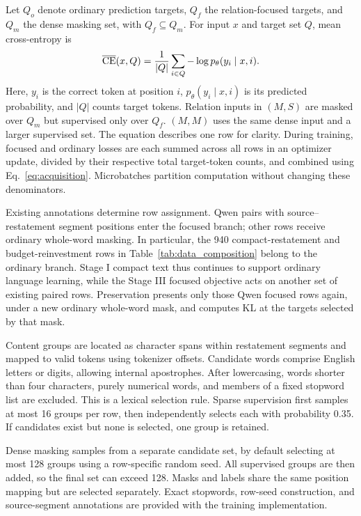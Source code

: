 Let $Q_o$ denote ordinary prediction targets, $Q_f$ the relation-focused targets, and $Q_m$ the dense masking set, with $Q_f\subseteq Q_m$. For input $x$ and target set $Q$, mean cross-entropy is
\begin{equation}
 \overline{\operatorname{CE}}(x,Q)=\frac{1}{|Q|}\sum_{i\in Q}-\log p_\theta(y_i\mid x,i).
\end{equation}
Here, $y_i$ is the correct token at position $i$, $p_\theta(y_i\mid x,i)$ is its predicted probability, and $|Q|$ counts target tokens. Relation inputs in $(M,S)$ are masked over $Q_m$ but supervised only over $Q_f$. $(M,M)$ uses the same dense input and a larger supervised set. The equation describes one row for clarity. During training, focused and ordinary losses are each summed across all rows in an optimizer update, divided by their respective total target-token counts, and combined using Eq.~\eqref{eq:acquisition}. Microbatches partition computation without changing these denominators.

Existing annotations determine row assignment. Qwen pairs with source--restatement segment positions enter the focused branch; other rows receive ordinary whole-word masking. In particular, the 940 compact-restatement and budget-reinvestment rows in Table~\ref{tab:data_composition} belong to the ordinary branch. Stage I compact text thus continues to support ordinary language learning, while the Stage III focused objective acts on another set of existing paired rows. Preservation presents only those Qwen focused rows again, under a new ordinary whole-word mask, and computes KL at the targets selected by that mask.

Content groups are located as character spans within restatement segments and mapped to valid tokens using tokenizer offsets. Candidate words comprise English letters or digits, allowing internal apostrophes. After lowercasing, words shorter than four characters, purely numerical words, and members of a fixed stopword list are excluded. This is a lexical selection rule. Sparse supervision first samples at most 16 groups per row, then independently selects each with probability 0.35. If candidates exist but none is selected, one group is retained.

Dense masking samples from a separate candidate set, by default selecting at most 128 groups using a row-specific random seed. All supervised groups are then added, so the final set can exceed 128. Masks and labels share the same position mapping but are selected separately. Exact stopwords, row-seed construction, and source-segment annotations are provided with the training implementation.

